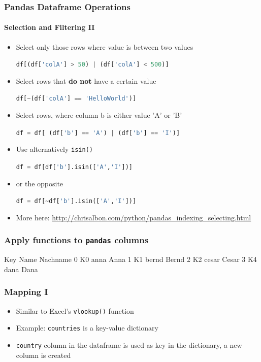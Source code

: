\documentclass[ngerman]{beamer}
\begin{document}
\begin{frame}[fragile]
\frametitle{Pandas Dataframe Operations}
\framesubtitle{Selection and Filtering II}

\begin{itemize}
\item Select only those rows where value is between two values

\lstinline[language={Python}]{df[(df['colA'] > 50) | (df['colA'] < 500)]}

\item Select rows that \textbf{do not} have a certain value

\lstinline[language={Python}]{df[~(df['colA'] == 'HelloWorld')]}

\item Select rows, where column b is either value 'A' or 'B' 

\lstinline[language={Python}]{df = df[ (df['b'] == 'A') | (df['b'] == 'I')]}

\item Use alternatively  \lstinline[language={Python}]{isin()}

\lstinline[language={Python}]{df = df[df['b'].isin(['A','I'])]}

\item or the opposite

\lstinline[language={Python}]{df = df[~df['b'].isin(['A','I'])]}

\item More here: \url{http://chrisalbon.com/python/pandas_indexing_selecting.html}

\end{itemize}
\end{frame}


\begin{frame}[containsverbatim]
\frametitle{Apply functions to \texttt{pandas} columns}



\begin{ausgabe}
  Key   Name Nachname
0  K0   anna     Anna
1  K1  bernd    Bernd
2  K2  cesar    Cesar
3  K4   dana     Dana
\end{ausgabe}

\end{frame}


\begin{frame}[fragile]
\frametitle{Mapping I}

\begin{itemize}
	\item Similar to Excel's \texttt{vlookup()} function
	\item Example: \texttt{countries} is a key-value dictionary
	\item \texttt{country} column in the dataframe is used as key in the dictionary, a new column is created
\end{itemize}



\end{frame}
\end{document}
